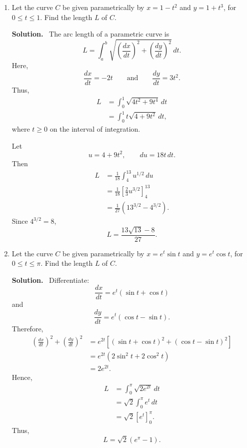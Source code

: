 \documentclass[11pt]{amsart}
\newcommand{\solution}{\par\noindent\textbf{Solution.}\ }
\begin{document}
\begin{enumerate}
\begin{enumerate}
\item Show that the point $(0,0)$ has both a horizontal tangent line and a vertical tangent line.

\solution
As written, this statement is not true for the given curve. For $t\neq0$,
\[
\frac{dy}{dx}
=\frac{4t^3}{3t^2}
=\frac{4t}{3}.
\]
Therefore,
\[
\lim_{t\to0}\frac{dy}{dx}=0,
\]
so the tangent line at $(0,0)$ is horizontal and has equation
\[
\boxed{y=0}.
\]
Eliminating the parameter gives
\[
y=t^4=(t^3)^{4/3}=x^{4/3},
\]
and the derivative of this rectangular equation also approaches $0$ at the origin. The curve does \emph{not} have a vertical tangent at $(0,0)$.

\medskip
\noindent\textbf{Instructor note:} The parametric equations must be changed if the intended conclusion is that the same point has both a horizontal and a vertical tangent.
\end{enumerate}

\item Let the curve $C$ be given parametrically by $x=1-t^2$ and $y=1+t^3$, for $0\leq t\leq 1$. Find the length $L$ of $C$.

\solution
The arc length of a parametric curve is
\[
L=\int_a^b\sqrt{\left(\frac{dx}{dt}\right)^2+
\left(\frac{dy}{dt}\right)^2}\,dt.
\]
Here,
\[
\frac{dx}{dt}=-2t
\qquad\text{and}\qquad
\frac{dy}{dt}=3t^2.
\]
Thus,
\begin{align*}
L
&=\int_0^1\sqrt{4t^2+9t^4}\,dt\\
&=\int_0^1 t\sqrt{4+9t^2}\,dt,
\end{align*}
where $t\geq0$ on the interval of integration.

Let
\[
u=4+9t^2,
\qquad du=18t\,dt.
\]
Then
\begin{align*}
L
&=\frac{1}{18}\int_4^{13}u^{1/2}\,du\\
&=\frac{1}{18}\left[\frac{2}{3}u^{3/2}\right]_4^{13}\\
&=\frac{1}{27}\left(13^{3/2}-4^{3/2}\right).
\end{align*}
Since $4^{3/2}=8$,
\[
\boxed{L=\frac{13\sqrt{13}-8}{27}}.
\]

\item Let the curve $C$ be given parametrically by $x=e^t\sin t$ and $y=e^t\cos t$, for $0\leq t\leq\pi$. Find the length $L$ of $C$.

\solution
Differentiate:
\[
\frac{dx}{dt}=e^t(\sin t+\cos t)
\]
and
\[
\frac{dy}{dt}=e^t(\cos t-\sin t).
\]
Therefore,
\begin{align*}
\left(\frac{dx}{dt}\right)^2+
\left(\frac{dy}{dt}\right)^2
&=e^{2t}\left[(\sin t+\cos t)^2+(\cos t-\sin t)^2\right]\\
&=e^{2t}(2\sin^2t+2\cos^2t)\\
&=2e^{2t}.
\end{align*}
Hence,
\begin{align*}
L
&=\int_0^\pi\sqrt{2e^{2t}}\,dt\\
&=\sqrt{2}\int_0^\pi e^t\,dt\\
&=\sqrt{2}\left[e^t\right]_0^\pi.
\end{align*}
Thus,
\[
\boxed{L=\sqrt{2}\left(e^\pi-1\right)}.
\]


\end{enumerate}
\end{document}
